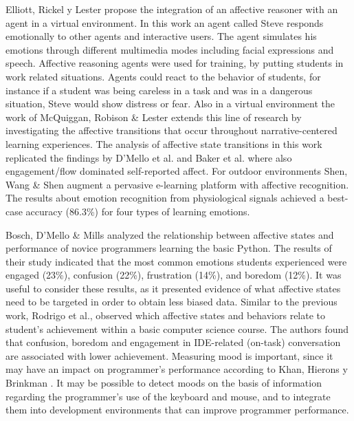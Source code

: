\documentclass[a4paper,twoside]{article}
\begin{document}
Elliott, Rickel y Lester \cite{elliott1999lifelike,d2008autotutor} propose the integration of an affective reasoner
with an agent in a virtual environment. In this work an agent called Steve
responds emotionally to other agents and interactive users. The agent simulates
his emotions through different multimedia modes including facial expressions and
speech. Affective reasoning agents were used for training, by putting students
in work related situations. Agents could react to the behavior of students, for
instance if a student was being careless in a task and was in a dangerous
situation, Steve would show distress or fear. Also in a virtual environment the
work of McQuiggan, Robison \& Lester \cite{mcquiggan2010affective} extends this line of research by
investigating the affective transitions that occur throughout narrative-centered
learning experiences. The analysis of affective state transitions in this work
replicated the findings by D’Mello et al. \cite{d2008autotutor} and Baker et al. 
\cite{rodrigo2009affective} where
also engagement/flow dominated self-reported affect. For outdoor environments
Shen, Wang \& Shen \cite{shen2009affective} augment a pervasive e-learning platform with affective
recognition.  The results about emotion recognition from physiological signals
achieved a best-case accuracy (86.3\%) for four types of learning emotions.

Bosch, D'Mello \& Mills \cite{bosch2013emotions} analyzed the relationship between affective states
and performance of novice programmers learning the basic Python. The results of their study
indicated that the most common emotions students experienced were engaged
(23\%), confusion (22\%), frustration (14\%), and boredom (12\%). It was useful
to consider these results, as it presented evidence of what affective states
need to be targeted in order to obtain less biased data. Similar to
the previous work, Rodrigo et al., \cite{rodrigo2009affective} observed which affective states and
behaviors relate to student's achievement within a basic computer science
course. The authors found that confusion, boredom and engagement in IDE-related
(on-task) conversation are associated with lower achievement. Measuring mood is important, since it may have an impact on programmer’s performance according
to Khan, Hierons y Brinkman \cite{khan2007mood}. It may be possible to detect moods
on the basis of information regarding the programmer’s use of the keyboard and
mouse, and to integrate them into development environments that can improve
programmer performance. 
\end{document}
